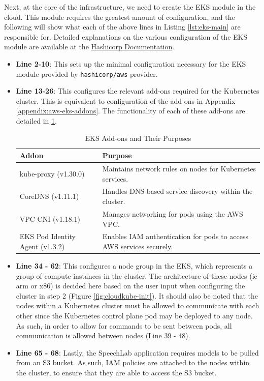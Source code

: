 Next, at the core of the infrastructure, we need to create the EKS module in the cloud. This module requires the greatest amount of
configuration, and the following will show what each of the above lines in Listing \ref{lst:eks-main} are responsible for. Detailed
explanations on the various configuration of the EKS module are available at the \href{https://registry.terraform.io/modules/terraform-aws-modules/eks/aws/20.33.1}{\color{blue}Hashicorp Documentation}.
\vspace{-1em}
\begin{itemize}
    \item \textbf{Line 2-10}: This sets up the minimal configuration necessary for the EKS module provided by \texttt{hashicorp/aws} provider.
    \item \textbf{Line 13-26}: This configures the relevant add-ons required for the Kubernetes cluster. This is equivalent to configuration of the add ons in Appendix \ref{appendix:aws-eks-addons}.
    The functionality of each of these add-ons are detailed in \ref{table:eks-addons}.
    \begin{table}[h]
        \centering
        \begin{tabular}{|l|p{10cm}|}
            \hline
            \textbf{Addon} & \textbf{Purpose} \\
            \hline
            kube-proxy (v1.30.0) & Maintains network rules on nodes for Kubernetes services. \\
            \hline
            CoreDNS (v1.11.1) & Handles DNS-based service discovery within the cluster. \\
            \hline
            VPC CNI (v1.18.1) & Manages networking for pods using the AWS VPC. \\
            \hline
            EKS Pod Identity Agent (v1.3.2) & Enables IAM authentication for pods to access AWS services securely. \\
            \hline
        \end{tabular}
        \caption{EKS Add-ons and Their Purposes}
        \label{table:eks-addons}
    \end{table}
    \vspace{-1em}
    \item \textbf{Line 34 - 62}: This configures a node group in the EKS, which represents a group of compute instances in the cluster. The architecture of these nodes (ie arm or x86) is decided here based on the user input when configuring the cluster in step 2 (Figure \ref{fig:cloudkube-init}). It should also be noted that the nodes within a Kubernetes cluster must be allowed to communicate with each other since the Kubernetes control plane pod may be deployed to any node. As such, in order to allow for commands to be sent between pods, all communication is allowed between nodes (Line 39 - 48).
    \item \textbf{Line 65 - 68}: Lastly, the SpeechLab application requires models to be pulled from an S3 bucket. As such, IAM policies are attached to the nodes within the cluster, to ensure that they are able to access the S3 bucket.
\end{itemize}

